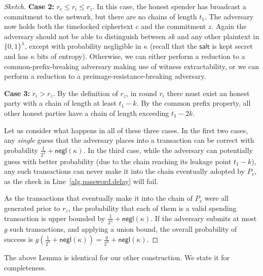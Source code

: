 \begin{proof}[Sketch]
  \textbf{Case 2:} $r_c \leq r_i \leq r_z$.
  In this case, the honest spender has broadcast a commitment to the network, but there
  are no chains of length $t_1$. The adversary now holds both the timelocked ciphertext $c$
  and the commitment $z$. Again the adversary should not be able to distinguish between $sk$
  and any other plaintext in $\{0, 1\}^\lambda$, except with probability negligible in
  $\kappa$ (recall that the $\textsf{salt}$ is kept secret and has $\kappa$ bits of entropy).
  Otherwise, we can either perform a reduction to a common-prefix-breaking adversary
  making use of witness extractability, or we can perform a reduction to a
  preimage-resistance-breaking adversary.

  \textbf{Case 3:} $r_i > r_z$.
  By the definition of $r_z$, in round $r_i$ there must exist an honest party
  with a chain of length at least $t_1 - k$. By the common prefix property, all
  other honest parties have a chain of length exceeding $t_1 - 2k$.

  Let us consider what happens in all of these three cases. In the first two cases, any
  \emph{single} guess that the adversary places into a transaction can be correct with
  probability $\frac{1}{2^\lambda} + \textsf{negl}(\kappa)$. In the third
  case, while the adversary can potentially guess with better probability (due to the chain
  reaching its leakage point $t_1 - k$), any such transactions can never make it into
  the chain eventually adopted by $P_v$, as the check in Line~\ref{alg.password.delay}
  will fail.

  As the transactions that eventually make it into the chain of $P_v$ were all generated prior
  to $r_z$, the probability that each of them is a valid spending transaction is
  upper bounded by $\frac{1}{2^\lambda} + \textsf{negl}(\kappa)$.
  If the adversary submits at most $g$
  such transactions, and applying a union bound, the overall probability of success
  is $g(\frac{1}{2^\lambda} + \textsf{negl}(\kappa)) = \frac{g}{2^\lambda} + \textsf{negl}(\kappa)$.
\end{proof}

The above Lemma is identical for our other construction. We state it for completeness.

